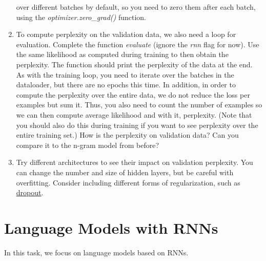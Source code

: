 \documentclass[11pt,a4paper]{article}
\begin{document}
\begin{enumerate}[label=(\alph*)]
          over different batches by default, so you need to zero them after each
          batch, using the \emph{optimizer.zero\_grad()} function.
    \item To compute perplexity on the validation data, we also need a loop for
          evaluation.
          Complete the function \emph{evaluate} (ignore the \emph{rnn} flag for
          now).
          Use the same likelihood as computed during training to then obtain the
          perplexity.
          The function should print the perplexity of the data at the end.
          As with the training loop, you need to iterate over the batches in the
          dataloader, but there are no epochs this time.
          In addition, in order to compute the perplexity over the entire data,
          we do not reduce the loss per examples but sum it.
          Thus, you also need to count the number of examples so we can then
          compute average likelihood and with it, perplexity.
          (Note that you should also do this during training if you want to see
          perplexity over the entire training set.)
          How is the perplexity on validation data? Can you compare it to the
          n-gram model from before?
    \item Try different architectures to see their impact on validation
          perplexity. You can change the number and size of hidden layers, but
          be careful with overfitting.
          Consider including different forms of regularization, such as
          \href{https://pytorch.org/docs/stable/generated/torch.nn.Dropout.html}{\underline{dropout}}.
\end{enumerate}

\section{Language Models with RNNs}

In this task, we focus on language models based on RNNs.
\end{document}
